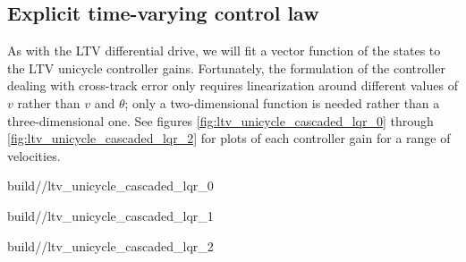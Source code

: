 \subsection{Explicit time-varying control law}

As with the LTV differential drive, we will fit a vector function of the states
to the LTV unicycle controller gains. Fortunately, the formulation of the
controller dealing with cross-track error only requires linearization around
different values of $v$ rather than $v$ and $\theta$; only a two-dimensional
function is needed rather than a three-dimensional one. See figures
\ref{fig:ltv_unicycle_cascaded_lqr_0} through
\ref{fig:ltv_unicycle_cascaded_lqr_2} for plots of each controller gain for a
range of velocities.
\begin{bookfigure}
  \begin{minisvg}{2}{build/\chapterpath/ltv_unicycle_cascaded_lqr_0}
    \caption{Linear time-varying unicycle controller cascaded LQR gain
      regression ($x$)}
    \label{fig:ltv_unicycle_cascaded_lqr_0}
  \end{minisvg}
  \hfill
  \begin{minisvg}{2}{build/\chapterpath/ltv_unicycle_cascaded_lqr_1}
    \caption{Linear time-varying unicycle controller cascaded LQR gain
      regression ($y$)}
  \end{minisvg}
  \hfill
  \begin{minisvg}{2}{build/\chapterpath/ltv_unicycle_cascaded_lqr_2}
    \caption{Linear time-varying unicycle controller cascaded LQR gain
      regression ($\theta$)}
    \label{fig:ltv_unicycle_cascaded_lqr_2}
  \end{minisvg}
\end{bookfigure}

